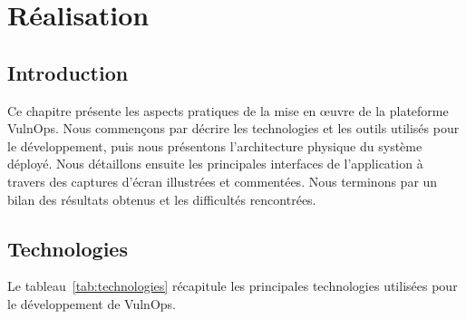\documentclass[12pt, a4paper, oneside]{report}
\begin{document}
\chapter{Réalisation}
\label{chap:realisation}

\section*{Introduction}

Ce chapitre présente les aspects pratiques de la mise en œuvre de la plateforme
VulnOps. Nous commençons par décrire les technologies et les outils utilisés
pour le développement, puis nous présentons l'architecture physique du système
déployé. Nous détaillons ensuite les principales interfaces de l'application
à travers des captures d'écran illustrées et commentées. Nous terminons par
un bilan des résultats obtenus et les difficultés rencontrées.

\section{Technologies}
\label{sec:technologies}

Le tableau~\ref{tab:technologies} récapitule les principales technologies
utilisées pour le développement de VulnOps.
\end{document}
